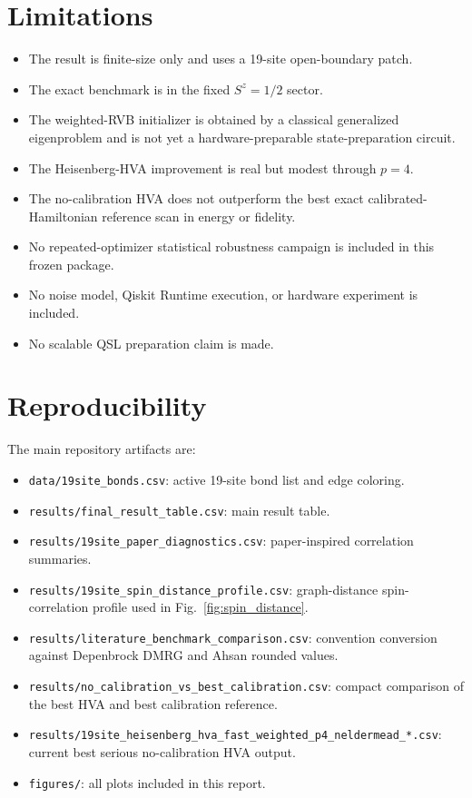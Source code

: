 \documentclass[11pt]{article}
\begin{document}
\section{Limitations}

\begin{itemize}
\item The result is finite-size only and uses a 19-site open-boundary patch.
\item The exact benchmark is in the fixed $S^z=1/2$ sector.
\item The weighted-RVB initializer is obtained by a classical generalized eigenproblem and is not yet a hardware-preparable state-preparation circuit.
\item The Heisenberg-HVA improvement is real but modest through $p=4$.
\item The no-calibration HVA does not outperform the best exact calibrated-Hamiltonian reference scan in energy or fidelity.
\item No repeated-optimizer statistical robustness campaign is included in this frozen package.
\item No noise model, Qiskit Runtime execution, or hardware experiment is included.
\item No scalable QSL preparation claim is made.
\end{itemize}

\section{Reproducibility}

The main repository artifacts are:
\begin{itemize}
\item \texttt{data/19site\_bonds.csv}: active 19-site bond list and edge coloring.
\item \texttt{results/final\_result\_table.csv}: main result table.
\item \texttt{results/19site\_paper\_diagnostics.csv}: paper-inspired correlation summaries.
\item \texttt{results/19site\_spin\_distance\_profile.csv}: graph-distance spin-correlation profile used in Fig.~\ref{fig:spin_distance}.
\item \texttt{results/literature\_benchmark\_comparison.csv}: convention conversion against Depenbrock DMRG and Ahsan rounded values.
\item \texttt{results/no\_calibration\_vs\_best\_calibration.csv}: compact comparison of the best HVA and best calibration reference.
\item \texttt{results/19site\_heisenberg\_hva\_fast\_weighted\_p4\_neldermead\_*.csv}: current best serious no-calibration HVA output.
\item \texttt{figures/}: all plots included in this report.
\end{itemize}
\end{document}
